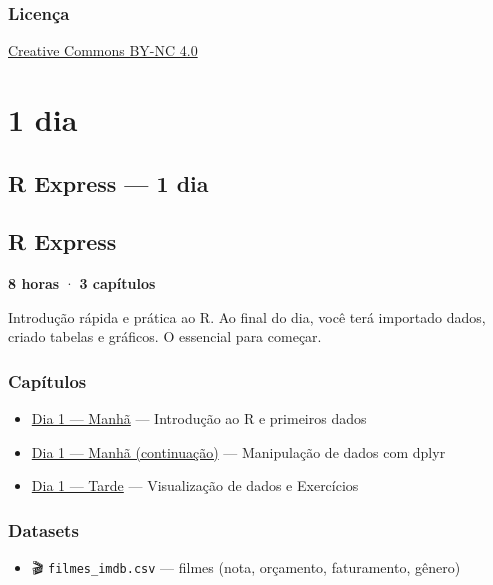 \documentclass[
  letterpaper,
]{scrbook}
\providecommand{\tightlist}{%
  \setlength{\itemsep}{0pt}\setlength{\parskip}{0pt}}
\begin{document}
\section{Licença}\label{licenuxe7a}

\href{https://creativecommons.org/licenses/by-nc/4.0/}{Creative Commons
BY-NC 4.0}

\part{1 dia}

\chapter{R Express --- 1 dia}\label{r-express-1-dia}

\chapter*{R Express}\label{r-express}


\textbf{8 horas} · \textbf{3 capítulos}

Introdução rápida e prática ao R. Ao final do dia, você terá importado
dados, criado tabelas e gráficos. O essencial para começar.

\section{Capítulos}\label{capuxedtulos}

\begin{itemize}
\tightlist
\item
  \href{d1-manha-parte1.qmd}{Dia 1 --- Manhã} --- Introdução ao R e
  primeiros dados
\item
  \href{d1-manha-parte2.qmd}{Dia 1 --- Manhã (continuação)} ---
  Manipulação de dados com dplyr
\item
  \href{d1-tarde.qmd}{Dia 1 --- Tarde} --- Visualização de dados e
  Exercícios
\end{itemize}

\section{Datasets}\label{datasets}

\begin{itemize}
\tightlist
\item
  🎬 \texttt{filmes\_imdb.csv} --- filmes (nota, orçamento, faturamento,
  gênero)
\end{itemize}
\end{document}
